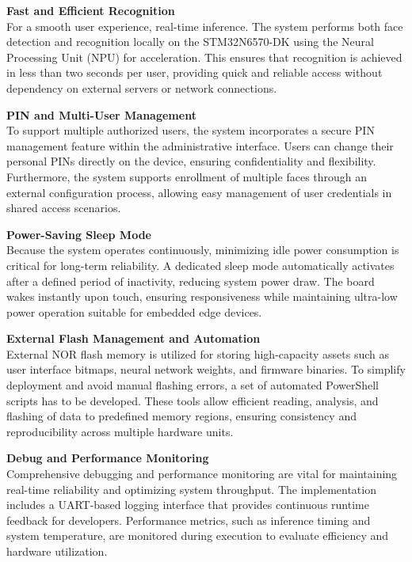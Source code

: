\vspace{0.5em}
\textbf{Fast and Efficient Recognition}\\
For a smooth user experience, real-time inference. The system performs both face detection and recognition locally on the STM32N6570-DK using the Neural Processing Unit (NPU) for acceleration. This ensures that recognition is achieved in less than two seconds per user, providing quick and reliable access without dependency on external servers or network connections.

\vspace{0.5em}
\textbf{PIN and Multi-User Management}\\
To support multiple authorized users, the system incorporates a secure PIN management feature within the administrative interface. Users can change their personal PINs directly on the device, ensuring confidentiality and flexibility. Furthermore, the system supports enrollment of multiple faces through an external configuration process, allowing easy management of user credentials in shared access scenarios.

\vspace{0.5em}
\textbf{Power-Saving Sleep Mode}\\
Because the system operates continuously, minimizing idle power consumption is critical for long-term reliability. A dedicated sleep mode automatically activates after a defined period of inactivity, reducing system power draw. The board wakes instantly upon touch, ensuring responsiveness while maintaining ultra-low power operation suitable for embedded edge devices.

\vspace{0.5em}
\textbf{External Flash Management and Automation}\\
External NOR flash memory is utilized for storing high-capacity assets such as user interface bitmaps, neural network weights, and firmware binaries. To simplify deployment and avoid manual flashing errors, a set of automated PowerShell scripts has to be developed. These tools allow efficient reading, analysis, and flashing of data to predefined memory regions, ensuring consistency and reproducibility across multiple hardware units.

\vspace{0.5em}
\textbf{Debug and Performance Monitoring}\\
Comprehensive debugging and performance monitoring are vital for maintaining real-time reliability and optimizing system throughput. The implementation includes a UART-based logging interface that provides continuous runtime feedback for developers. Performance metrics, such as inference timing and system temperature, are monitored during execution to evaluate efficiency and hardware utilization.

